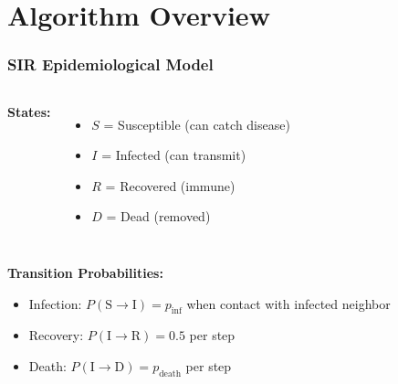 \documentclass{beamer}
\begin{document}
\section{Algorithm Overview}

\begin{frame}
\frametitle{SIR Epidemiological Model}

\begin{columns}
\textbf{States:}
\begin{itemize}
    \item $S$ = Susceptible (can catch disease)
    \item $I$ = Infected (can transmit)
    \item $R$ = Recovered (immune)
    \item $D$ = Dead (removed)
\end{itemize}

\end{columns}

\vspace{1cm}

\textbf{Transition Probabilities:}
\begin{itemize}
    \item Infection: $P(\text{S} \to \text{I}) = p_{\text{inf}}$ when contact with infected neighbor
    \item Recovery: $P(\text{I} \to \text{R}) = 0.5$ per step
    \item Death: $P(\text{I} \to \text{D}) = p_{\text{death}}$ per step
\end{itemize}
\end{frame}
\end{document}
